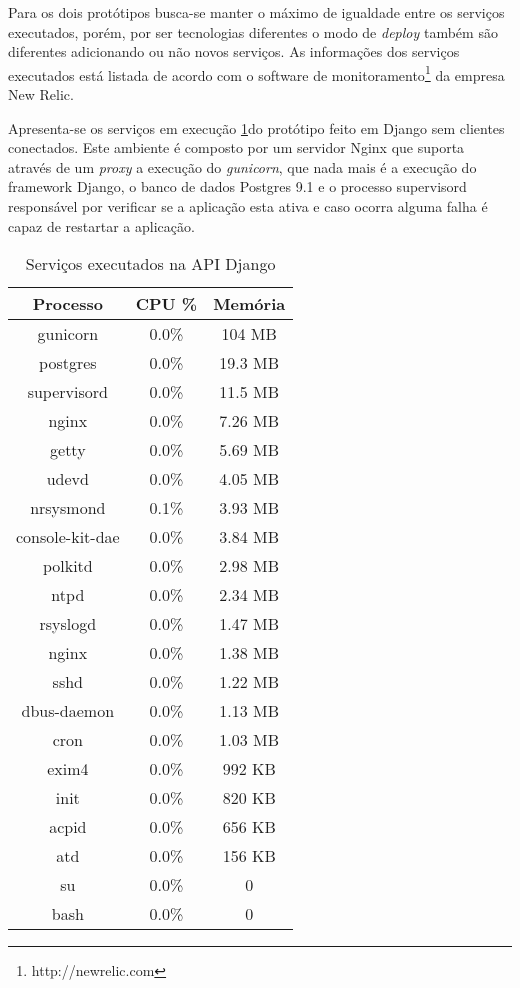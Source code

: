   Para os dois protótipos busca-se manter o máximo de igualdade entre os serviços executados, porém, por ser 
  tecnologias diferentes o modo de \textit{deploy} também são diferentes adicionando ou não novos serviços. 
  As informações dos serviços executados está listada de acordo com o software de monitoramento\footnote{http://newrelic.com}
  da empresa New Relic.
  
  Apresenta-se os serviços em execução \ref{tab:services-in-api-django}do protótipo feito em Django sem clientes conectados.
  Este ambiente é composto por um servidor Nginx que suporta através de um \textit{proxy} a execução do \textit{gunicorn},
  que nada mais é a execução do framework Django, o banco de dados Postgres 9.1 e o processo supervisord responsável por
  verificar se a aplicação esta ativa e caso ocorra alguma falha é capaz de restartar a aplicação.
  
  \begin{table}[H]
    \centering
    \footnotesize
    \setlength{\abovecaptionskip}{0pt}
    \setlength{\belowcaptionskip}{0pt}
    \caption[Serviços executados na API Django]{Serviços executados na API Django}
    \label{tab:services-in-api-django}
    \begin{tabular}{c|c|c}
      \hline \hline
      Processo  & 	CPU \% &	Memória \\
      \hline \hline
      gunicorn &	0.0\% &		104 MB \\
      postgres &	0.0\% &		19.3 MB \\
      supervisord &	0.0\% &		11.5 MB \\
      nginx &		0.0\% &		7.26 MB \\
      getty &		0.0\% &		5.69 MB \\
      udevd &		0.0\% &		4.05 MB \\
      nrsysmond &	0.1\% &		3.93 MB \\
      console-kit-dae &	0.0\% &		3.84 MB \\
      polkitd &	 	0.0\% &		2.98 MB \\
      ntpd &		0.0\% &		2.34 MB \\
      rsyslogd &	0.0\% &		1.47 MB \\
      nginx &		0.0\% &		1.38 MB \\
      sshd &		0.0\% &		1.22 MB \\
      dbus-daemon &	0.0\% &		1.13 MB \\
      cron &		0.0\% &		1.03 MB \\
      exim4 &		0.0\% &		992 KB \\
      init &		0.0\% &		820 KB \\
      acpid &		0.0\% &		656 KB \\
      atd &		0.0\% &		156 KB \\
      su &		0.0\% &		0 \\
      bash &		0.0\% &		0 \\
      \hline \hline
    \end{tabular}
  \end{table}

